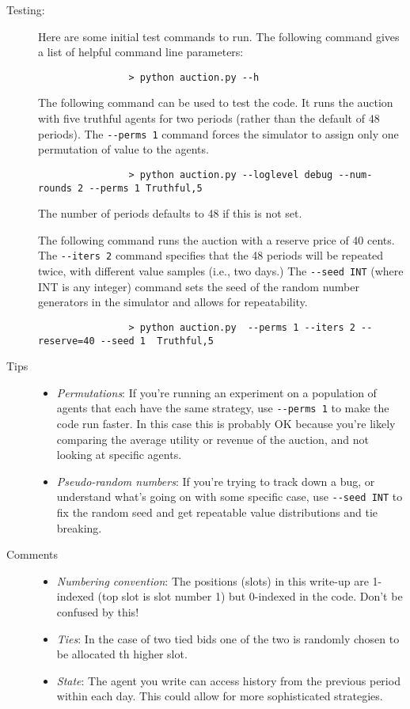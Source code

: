 \documentclass[11pt]{article}
\begin{document}
\begin{description}
		\item[Testing:] Here are some initial test commands to run. The following command gives a list of helpful command line parameters:
			\begin{verbatim}
				> python auction.py --h
			\end{verbatim}

			The following command can be used to test the code. It runs the auction with five truthful agents for two periods (rather than the default of 48 periods). The \verb+--perms 1+ command forces the simulator to assign only one permutation of value to the agents. %
			\begin{verbatim}
				> python auction.py --loglevel debug --num-rounds 2 --perms 1 Truthful,5
			\end{verbatim}

The number of periods defaults to 48 if this is not set.

The following command runs the auction with a reserve price of 40
cents. The \verb+--iters 2+ command specifies that the 48 periods will
be repeated twice, with different value samples (i.e., two days.)
%
The
%
\verb+--seed INT+ (where INT is any integer) command
 sets the seed of the random number generators in the simulator and
allows for repeatability.
%
			\begin{verbatim}
				> python auction.py  --perms 1 --iters 2 --reserve=40 --seed 1  Truthful,5
			\end{verbatim}


		\item[Tips]
			\begin{itemize}
				\item {\em Permutations}: If you're
running an experiment on a population of agents that each have the
same strategy,
use \verb+--perms 1+ to make the code run faster. In this case this is
probably OK because you're likely comparing the average utility or
revenue of the auction, and not looking at specific agents.
%
				\item {\em Pseudo-random numbers}: If you're trying to track down a bug, or understand what's going on with some specific case, use \verb+--seed INT+ to fix the random seed and get repeatable value distributions and tie breaking.
			\end{itemize}

\item[Comments]
\begin{itemize}
\item {\em Numbering convention}: The positions (slots) in this
  write-up are 1-indexed (top slot is slot number 1) but 0-indexed in
  the code. Don't be confused by this!
%
\item {\em Ties}: In the case of two tied bids one of the two is randomly chosen to be allocated th higher slot.
%
\item
{\em State}: The agent you write can access history from the previous period within each day.
This could allow for more sophisticated strategies.


\end{itemize}
\end{description}
\end{document}
